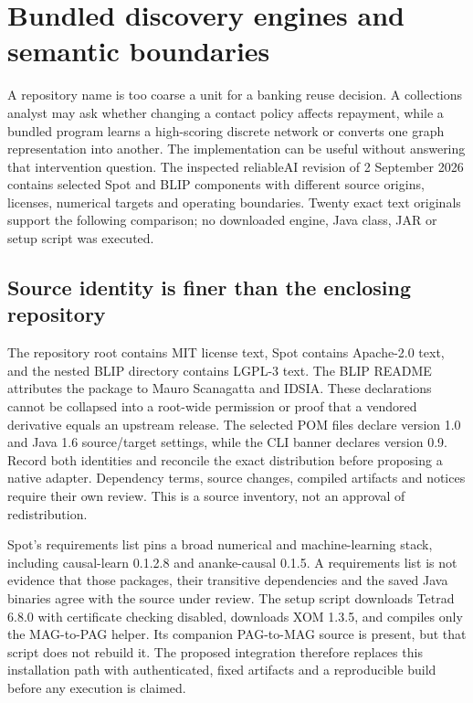 \section[Bundled discovery engines and semantic boundaries]{Bundled discovery engines and semantic boundaries}
\label{sec:exec28-nested-engines}
A repository name is too coarse a unit for a banking reuse decision. A collections
analyst may ask whether changing a contact policy affects repayment, while a
bundled program learns a high-scoring discrete network or converts one graph
representation into another. The implementation can be useful without answering
that intervention question. The inspected reliableAI revision of 2 September
2026 contains selected Spot and BLIP components with different source origins,
licenses, numerical targets and operating boundaries. Twenty exact text originals
support the following comparison; no downloaded engine, Java class, JAR or setup
script was executed.~\citep{exec28_nested_sources}

\subsection{Source identity is finer than the enclosing repository}
The repository root contains MIT license text, Spot contains Apache-2.0 text,
and the nested BLIP directory contains LGPL-3 text. The BLIP README attributes
the package to Mauro Scanagatta and IDSIA. These declarations cannot be collapsed
into a root-wide permission or proof that a vendored derivative equals an
upstream release. The selected POM files declare version 1.0 and Java 1.6
source/target settings, while the CLI banner declares version 0.9. Record both
identities and reconcile the exact distribution before proposing a native
adapter. Dependency terms, source changes, compiled artifacts and notices require
their own review. This is a source inventory, not an approval of redistribution.
\citep{exec28_nested_sources}

Spot's requirements list pins a broad numerical and machine-learning stack,
including causal-learn 0.1.2.8 and ananke-causal 0.1.5. A requirements list is
not evidence that those packages, their transitive dependencies and the saved
Java binaries agree with the source under review. The setup script downloads
Tetrad 6.8.0 with certificate checking disabled, downloads XOM 1.3.5, and compiles
only the MAG-to-PAG helper. Its companion PAG-to-MAG source is present, but that
script does not rebuild it. The proposed integration therefore replaces this
installation path with authenticated, fixed artifacts and a reproducible build
before any execution is claimed.~\citep{exec28_nested_sources}

